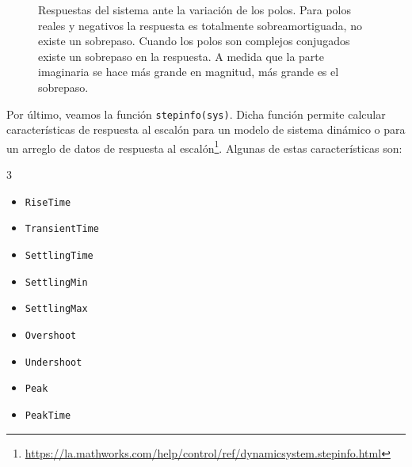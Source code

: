 \begin{figure}[ht!]
    \centering
    \caption{Respuestas del sistema ante la variación de los polos. Para polos reales y negativos la respuesta es totalmente sobreamortiguada, no existe un sobrepaso. Cuando los polos son complejos conjugados existe un sobrepaso en la respuesta. A medida que la parte imaginaria se hace más grande en magnitud, más grande es el sobrepaso.}
    \label{fig:3}
\end{figure}



Por último, veamos la función \texttt{stepinfo(sys)}. Dicha función permite calcular características de respuesta al escalón para un modelo de sistema dinámico o para un arreglo de datos de respuesta al escalón\footnote{\url{https://la.mathworks.com/help/control/ref/dynamicsystem.stepinfo.html}}. Algunas de estas características son:

\begin{multicols}{3}
    \begin{itemize}
        \item \texttt{RiseTime}
        \item \texttt{TransientTime}
        \item \texttt{SettlingTime}
        \item \texttt{SettlingMin}
        \item \texttt{SettlingMax}
        \item \texttt{Overshoot}
        \item \texttt{Undershoot}
        \item \texttt{Peak}
        \item \texttt{PeakTime}
    \end{itemize}
\end{multicols}


